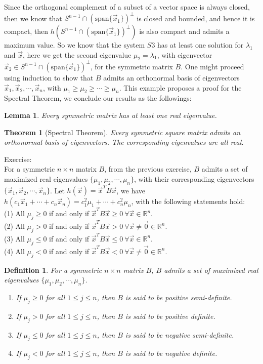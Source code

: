 \documentclass[11pt,oneside]{book}
\theoremstyle{break}
\theoremstyle{break}
\newtheorem{thm}{Theorem}[section]
\newtheorem{lem}{Lemma}[thm]
\newtheorem{defn}{Definition}[corL]
\newcommand{\R}{\mathbb{R}}
\newcommand{\spa}{\text{span}}
\newcommand{\exercise}{\color{green}Exercise: \color{black}}
\begin{document}
Since the orthogonal complement of a subset of a vector space is always closed, then we know that $ S^{n-1}\cap (\spa\{ \vec{x}_1\})^\perp$ is closed and bounded, and hence it is compact, then $h( S^{n-1}\cap (\spa\{ \vec{x}_1\})^\perp)$ is also compact and admits a maximum value. So we know that the system $S3$ has at least one solution for $\lambda_1$ and $\vec{x}$, here we get the second eigenvalue $\mu_2 = \lambda_1$, with eigenvector $\vec{x}_2 \in S^{n-1}\cap (\spa\{ \vec{x}_1\})^\perp$, for the symmetric matrix $B$. One might proceed using induction to show that $B$ admits an orthonormal basis of eigenvectors $\vec{x}_1,\vec{x}_2,\cdots,\vec{x}_n$, with $\mu_1 \geq \mu_2 \geq \cdots \geq \mu_n$. This example proposes a proof for the Spectral Theorem, we conclude our results as the followings:

\begin{lem}
Every symmetric matrix has at least one real eigenvalue. 
\end{lem}

\begin{thm}[Spectral Theorem]
Every symmetric square matrix admits an orthonormal basis of eigenvectors. The corresponding eigenvalues are all real.
\end{thm}

\exercise\\
For a symmetric $n\times n$ matrix $B$, from the previous exercise, $B$ admits a set of maximized real eigenvalues $\{\mu_1,\mu_2,\cdots,\mu_n\}$, with their corresponding eigenvectors $\{\vec{x}_1,\vec{x}_2,\cdots,\vec{x}_n\}$. Let $h(\vec{x}) = \vec{x}^TB\vec{x}$, we have $h(c_1\vec{x}_1 + \cdots + c_n\vec{x}_n) = c_1^2\mu_1 + \cdots + c_n^2 \mu_n$, with the following statements hold:\\
(1) All $\mu_j \geq 0$ if and only if $\vec{x}^T B \vec{x} \geq 0\ \forall\vec{x} \in \R^n$.\\
(2) All $\mu_j >0$ if and only if $\vec{x}^T B \vec{x} > 0\ \forall\vec{x}\neq \vec{0}\in \R^n$.\\
(3) All $\mu_j \leq 0$ if and only if $\vec{x}^T B \vec{x} \leq 0\ \forall\vec{x} \in \R^n$.\\
(4) All $\mu_j <0$ if and only if $\vec{x}^T B \vec{x} < 0\ \forall\vec{x}\neq \vec{0}\in \R^n$.\\

\begin{defn}
For a symmetric $n\times n$ matrix $B$, $B$ admits a set of maximized real eigenvalues $\{\mu_1,\mu_2,\cdots,\mu_n\}$.
\begin{enumerate}[topsep=3pt,itemsep=-1ex,partopsep=1ex,parsep=1ex]
\item If $\mu_j \geq 0$ for all $1\leq j \leq n$, then $B$ is said to be positive semi-definite.
\item If $\mu_j > 0$ for all $1\leq j \leq n$, then $B$ is said to be positive definite.
\item If $\mu_j \leq 0$ for all $1\leq j \leq n$, then $B$ is said to be negative semi-definite.
\item If $\mu_j < 0$ for all $1\leq j \leq n$, then $B$ is said to be negative definite.
\end{enumerate}
\end{defn}
\end{document}
